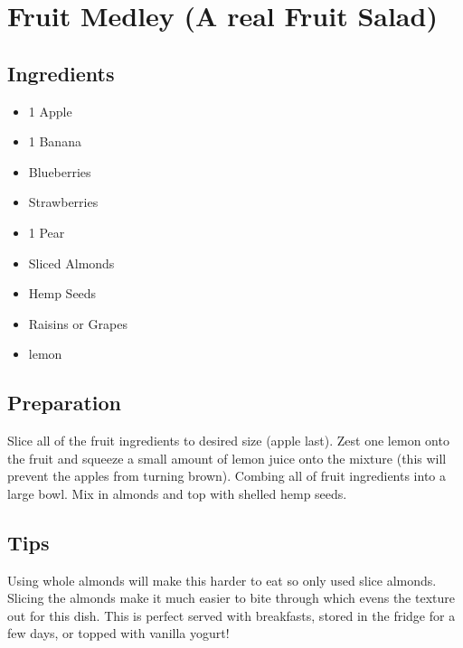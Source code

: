 \thispagestyle{fancy}
\section{Fruit Medley (A real Fruit Salad)}
\AddToShipoutPicture*{\FruitMedley}

\subsection*{Ingredients}
\begin{multicols}{3}
	\begin{itemize}
		\item 1 Apple
		\item 1 Banana
		\item Blueberries
		\item Strawberries
		\item 1 Pear
		\item Sliced Almonds
		\item Hemp Seeds
		\item Raisins or Grapes
		\item lemon
	\end{itemize}
\end{multicols}

\subsection*{Preparation}

Slice all of the fruit ingredients to desired size (apple last). Zest one lemon onto the fruit and squeeze a small amount of lemon juice onto the mixture (this will prevent the apples from turning brown). Combing all of fruit ingredients into a large bowl. Mix in almonds and top with shelled hemp seeds.

\subsection*{Tips}
Using whole almonds will make this harder to eat so only used slice almonds. Slicing the almonds make it much easier to bite through which evens the texture out for this dish. This is perfect served with breakfasts, stored in the fridge for a few days, or topped with vanilla yogurt!